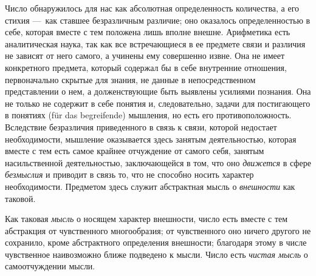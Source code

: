 {Число обнаружилось для нас как абсолютная определенность количества, а его
стихия —~как ставшее безразличным различие; оно оказалось определенностью в
себе, которая вместе с тем положена лишь вполне внешне. Арифметика есть
аналитическая наука, так как все встречающиеся в ее предмете связи и
различия не зависят от него самого, а учинены ему совершенно извне. Она не
имеет конкретного предмета, который содержал бы в себе внутренние
отношения, первоначально скрытые для знания, не данные в непосредственном
представлении о нем, а долженствующие быть выявлены усилиями познания. Она
не только не содержит в себе понятия и, следовательно, задачи для
постигающего в понятиях (für das begreifende) мышления, но есть его
противоположность. Вследствие безразличия приведенного в связь к связи,
которой недостает необходимости, мышление оказывается здесь занятым
деятельностью, которая вместе с тем есть самое крайнее отчуждение от самого
себя, занятым насильственной деятельностью, заключающейся в том, что оно
{\em движется} в сфере
{\em безмыслия} и приводит в связь то, что не способно
носить характер необходимости. Предметом здесь служит абстрактная мысль о
{\em внешности} как таковой.

Как таковая {\em мысль} о носящем характер внешности,
число есть вместе с тем абстракция от чувственного многообразия; от
чувственного оно ничего другого не сохранило, кроме абстрактного
определения внешности; благодаря этому в числе чувственное наивозможно
ближе подведено к мысли. Число есть {\em чистая мысль}
о самоотчуждении мысли.

}
